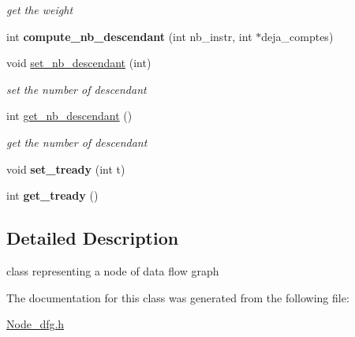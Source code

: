 \begin{DoxyCompactItemize}
\begin{DoxyCompactList}\small\item\em get the weight \end{DoxyCompactList}\item 
\hypertarget{class_node__dfg_a613aa3ee9ce2eb99df07258cbdd5293f}{}int {\bfseries compute\+\_\+nb\+\_\+descendant} (int nb\+\_\+instr, int $\ast$deja\+\_\+comptes)\label{class_node__dfg_a613aa3ee9ce2eb99df07258cbdd5293f}

\item 
\hypertarget{class_node__dfg_a9aa775f727e6c542cd714894219046f3}{}void \hyperlink{class_node__dfg_a9aa775f727e6c542cd714894219046f3}{set\+\_\+nb\+\_\+descendant} (int)\label{class_node__dfg_a9aa775f727e6c542cd714894219046f3}

\begin{DoxyCompactList}\small\item\em set the number of descendant \end{DoxyCompactList}\item 
\hypertarget{class_node__dfg_a9baa0a6be056b7d1ee290c404f2216f5}{}int \hyperlink{class_node__dfg_a9baa0a6be056b7d1ee290c404f2216f5}{get\+\_\+nb\+\_\+descendant} ()\label{class_node__dfg_a9baa0a6be056b7d1ee290c404f2216f5}

\begin{DoxyCompactList}\small\item\em get the number of descendant \end{DoxyCompactList}\item 
\hypertarget{class_node__dfg_ad9fe88cf90fa2282806edbc64f51331e}{}void {\bfseries set\+\_\+tready} (int t)\label{class_node__dfg_ad9fe88cf90fa2282806edbc64f51331e}

\item 
\hypertarget{class_node__dfg_a05e8db316dd2db8b0946167763585c7b}{}int {\bfseries get\+\_\+tready} ()\label{class_node__dfg_a05e8db316dd2db8b0946167763585c7b}

\end{DoxyCompactItemize}


\subsection{Detailed Description}
class representing a node of data flow graph 

The documentation for this class was generated from the following file\+:\begin{DoxyCompactItemize}
\item 
\hyperlink{_node__dfg_8h}{Node\+\_\+dfg.\+h}\end{DoxyCompactItemize}

